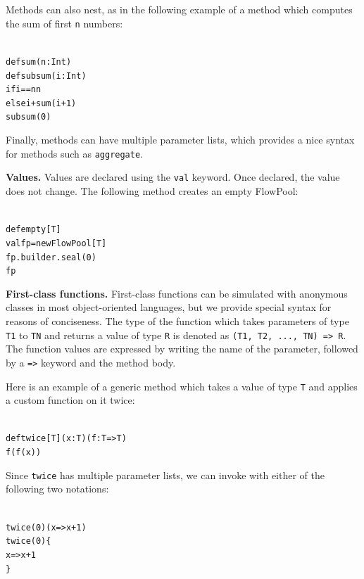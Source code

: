 \documentclass[runningheads,a4paper]{llncs}
\begin{document}
Methods can also nest, as in the following example of a method which computes
the sum of first \verb=n= numbers:

\begin{minipage}[b]{3.75 cm}
\begin{alltt}
{\scriptsize
def sum(n: Int)
  def subsum(i: Int)
    if i == n n
    else i + sum(i + 1)
  subsum(0)
}
\end{alltt}
\end{minipage}

Finally, methods can have multiple parameter lists, which provides a nice syntax
for methods such as \verb=aggregate=.


\textbf{Values.}
Values are declared using the \verb=val= keyword.
Once declared, the value does not change.
The following method creates an empty FlowPool:

\begin{minipage}[b]{3.75 cm}
\begin{alltt}
{\scriptsize
def empty[T]
  val fp = new FlowPool[T]
  fp.builder.seal(0)
  fp
}
\end{alltt}
\end{minipage}

\textbf{First-class functions.}
First-class functions can be simulated with anonymous classes in most object-oriented
languages, but we provide special syntax for reasons of conciseness.
The type of the function which takes parameters of type \verb=T1= to \verb=TN= and
returns a value of type \verb=R= is denoted as \verb+(T1, T2, ..., TN) => R+.
The function values are expressed by writing the name of the parameter, followed by
a \verb+=>+ keyword and the method body.

Here is an example of a generic method which takes a value of type \verb=T= and
applies a custom function on it twice:

\begin{minipage}[b]{3.75 cm}
\begin{alltt}
{\scriptsize
def twice[T](x: T)(f: T => T)
  f(f(x))
}
\end{alltt}
\end{minipage}

Since \verb=twice= has multiple parameter lists, we can invoke with either of the
following two notations:

\begin{minipage}[b]{3.75 cm}
\begin{alltt}
{\scriptsize
twice(0)(x => x + 1)
twice(0) \{
  x => x + 1
\}
}
\end{alltt}
\end{minipage}
\end{document}
